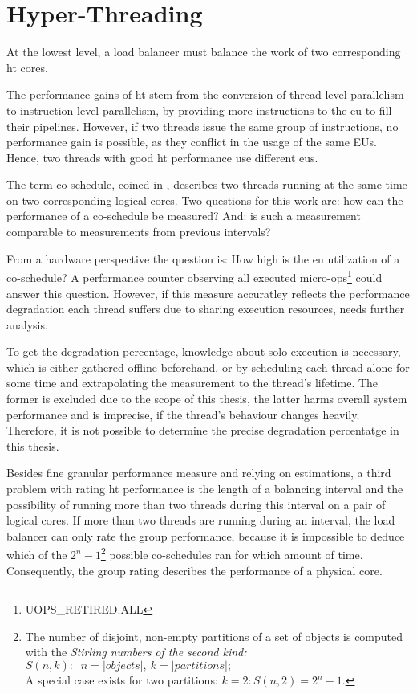 \section{Hyper-Threading}
\label{design:smt}


At the lowest level, a load balancer must balance the work of two corresponding
\gls{ht} cores.

The performance gains of \gls{ht} stem from the conversion of thread level
parallelism to instruction level parallelism, by providing more instructions to
the \gls{eu} to fill their pipelines.
However, if two threads issue the same group of instructions, no performance gain is
possible, as they conflict in the usage of the same EUs.
Hence, two threads with good \gls{ht} performance use different \gls{eu}s.

The term co-schedule, coined in \cite{snavely_symbiotic_2000}, describes two
threads running at the same time on two corresponding logical cores.
Two questions for this work are: how can the performance of a co-schedule be
measured? And: is such a measurement comparable to measurements from previous
intervals?

From a hardware perspective the question is: How high is the \gls{eu}
utilization of a co-schedule?
A performance counter observing all executed
micro-ops\footnote{UOPS\_RETIRED.ALL} could answer this question.
However, if this measure accuratley reflects the performance degradation each thread
suffers due to sharing execution resources, needs further analysis.

To get the degradation percentage, knowledge about solo execution is necessary,
which is either gathered offline beforehand, or by scheduling each thread alone
for some time and extrapolating the measurement to the thread's lifetime.
The former is excluded due to the scope of this thesis, the latter harms
overall system performance and is imprecise, if the thread's behaviour changes
heavily.
Therefore, it is not possible to determine the precise degradation percentatge
in this thesis.

Besides fine granular performance measure and relying on estimations, a third
problem with rating \gls{ht} performance is the length of a balancing interval
and the possibility of running more than two threads during this interval on a
pair of logical cores.
If more than two threads are running during an interval, the load balancer can
only rate the group performance, because it is impossible to deduce which
of the
$2^n-1$\footnote{The number of disjoint, non-empty partitions of a set of
  objects is computed with the \emph{Stirling numbers of the second kind:}
  $S(n,k):\;\; n = |objects|,\: k = |partitions|;$\\A special case exists for
two partitions: $k = 2: S(n,2) = 2^n-1$.}
%
possible co-schedules ran for which amount of time.
Consequently, the group rating describes the performance of a physical core.

